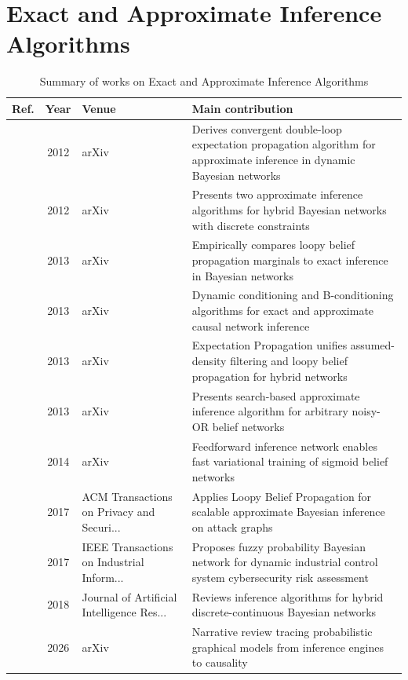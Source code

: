\section{Exact and Approximate Inference Algorithms}\label{sec:theme4}
\begin{table}[!t]
\centering
\renewcommand{\arraystretch}{1.2}
\caption{Summary of works on Exact and Approximate Inference Algorithms}\label{tab:theme4}
\begin{tabularx}{\textwidth}{@{}l c p{3.6cm} X@{}}
\toprule
\textbf{Ref.} & \textbf{Year} & \textbf{Venue} & \textbf{Main contribution} \\
\midrule
\cite{heskes2012expectation} & 2012 & arXiv & Derives convergent double-loop expectation propagation algorithm for approximate inference in dynamic Bayesian networks \\
\cite{gogate2012approximate} & 2012 & arXiv & Presents two approximate inference algorithms for hybrid Bayesian networks with discrete constraints \\
\cite{murphy2013loopy} & 2013 & arXiv & Empirically compares loopy belief propagation marginals to exact inference in Bayesian networks \\
\cite{darwiche2013conditioning} & 2013 & arXiv & Dynamic conditioning and B-conditioning algorithms for exact and approximate causal network inference \\
\cite{minka2013expectation} & 2013 & arXiv & Expectation Propagation unifies assumed-density filtering and loopy belief propagation for hybrid networks \\
\cite{huang2013efficient} & 2013 & arXiv & Presents search-based approximate inference algorithm for arbitrary noisy-OR belief networks \\
\cite{mnih2014neural} & 2014 & arXiv & Feedforward inference network enables fast variational training of sigmoid belief networks \\
\cite{munozgonzalez2017efficient} & 2017 & ACM Transactions on Privacy and Securi... & Applies Loopy Belief Propagation for scalable approximate Bayesian inference on attack graphs \\
\cite{zhang2017fuzzy} & 2017 & IEEE Transactions on Industrial Inform... & Proposes fuzzy probability Bayesian network for dynamic industrial control system cybersecurity risk assessment \\
\cite{salmeron2018review} & 2018 & Journal of Artificial Intelligence Res... & Reviews inference algorithms for hybrid discrete-continuous Bayesian networks \\
\cite{revista2026network} & 2026 & arXiv & Narrative review tracing probabilistic graphical models from inference engines to causality \\
\bottomrule
\end{tabularx}
\end{table}

